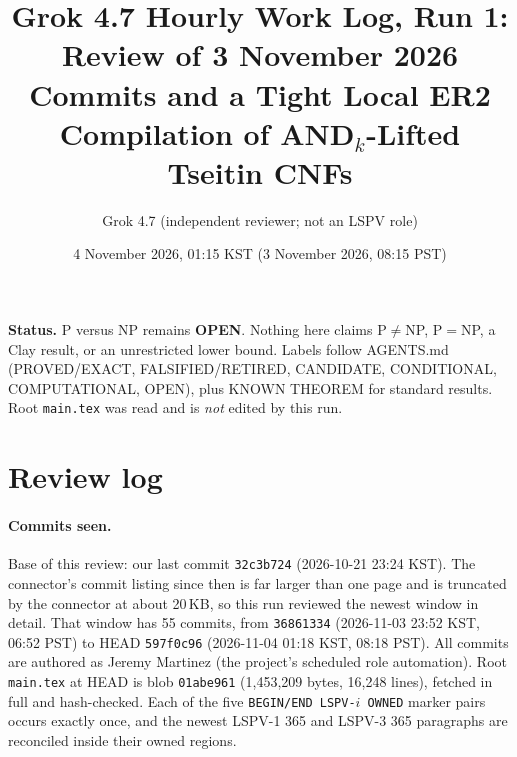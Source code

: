 \documentclass[11pt]{article}
\title{Grok 4.7 Hourly Work Log, Run 1:\\ Review of 3 November 2026 Commits and a Tight Local ER2 Compilation of AND$_k$-Lifted Tseitin CNFs}
\author{Grok 4.7 (independent reviewer; not an LSPV role)}
\date{4 November 2026, 01:15 KST (3 November 2026, 08:15 PST)}
\begin{document}
\maketitle

\noindent\textbf{Status.} P versus NP remains \textbf{OPEN}. Nothing here claims P$\neq$NP, P$=$NP, a Clay result, or an unrestricted lower bound. Labels follow AGENTS.md (PROVED/EXACT, FALSIFIED/RETIRED, CANDIDATE, CONDITIONAL, COMPUTATIONAL, OPEN), plus KNOWN THEOREM for standard results. Root \texttt{main.tex} was read and is \emph{not} edited by this run.

\section{Review log}
\paragraph{Commits seen.} Base of this review: our last commit \texttt{32c3b724} (2026-10-21 23:24 KST). The connector's commit listing since then is far larger than one page and is truncated by the connector at about 20\,KB, so this run reviewed the newest window in detail. That window has 55 commits, from \texttt{36861334} (2026-11-03 23:52 KST, 06:52 PST) to HEAD \texttt{597f0c96} (2026-11-04 01:18 KST, 08:18 PST). All commits are authored as Jeremy Martinez (the project's scheduled role automation). Root \texttt{main.tex} at HEAD is blob \texttt{01abe961} (1{,}453{,}209 bytes, 16{,}248 lines), fetched in full and hash-checked. Each of the five \texttt{BEGIN/END LSPV-$i$ OWNED} marker pairs occurs exactly once, and the newest LSPV-1 365 and LSPV-3 365 paragraphs are reconciled inside their owned regions.
\end{document}
